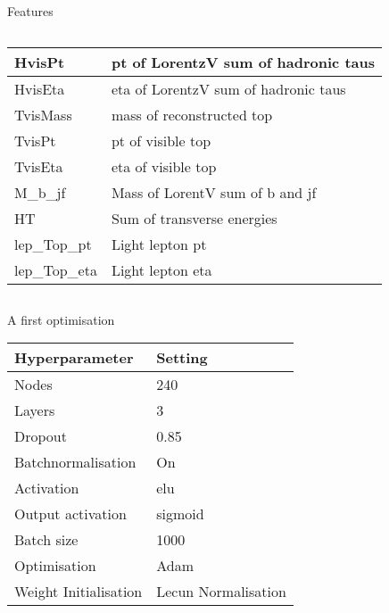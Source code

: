 \begin{frame}{Features}
\begin{columns}
\begin{column}{0.5\textwidth}
{\begin{tabular}{|l|l|}
                 HvisPt           & pt of LorentzV sum of hadronic taus      \\ \hline
                 HvisEta          & eta of LorentzV sum of hadronic taus      \\ \hline
                 TvisMass         & mass of reconstructed top             \\ \hline
                 TvisPt           & pt of visible top                     \\ \hline
                 TvisEta          & eta of visible top                    \\ \hline
                 M\_b\_jf         & Mass of LorentV sum of b and jf       \\ \hline
                 HT               & Sum of transverse energies            \\ \hline
                 lep\_Top\_pt     & Light lepton pt                       \\ \hline
                 lep\_Top\_eta    & Light lepton eta                      \\ \hline
             \end{tabular}}
        \end{column}
    \end{columns}
\end{frame}

\begin{frame}{A first optimisation}
    \begin{table}[]
    \begin{tabular}{|l|l|}
    \hline
    Hyperparameter          &     Setting              \\ \hline
    Nodes                   &     240                  \\ \hline
    Layers                  &     3                    \\ \hline
    Dropout                 &     0.85                  \\ \hline
    Batchnormalisation      &     On                   \\ \hline
    Activation              &     elu                  \\ \hline
    Output activation       &     sigmoid              \\ \hline
    Batch size              &     1000                 \\ \hline
    Optimisation            &     Adam                 \\ \hline
    Weight Initialisation   &     Lecun Normalisation  \\ \hline
    \end{tabular}
    \end{table}
\end{frame}
  
